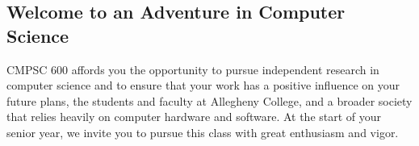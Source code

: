 \documentclass[11pt]{article}
\begin{document}
\subsection*{Welcome to an Adventure in Computer Science}

CMPSC 600 affords you the opportunity to pursue independent research in computer science and to ensure that your work
has a positive influence on your future plans, the students and faculty at Allegheny College, and a broader society that
relies heavily on computer hardware and software.  At the start of your senior year, we invite you to pursue this class
with great enthusiasm and vigor.
\end{document}
